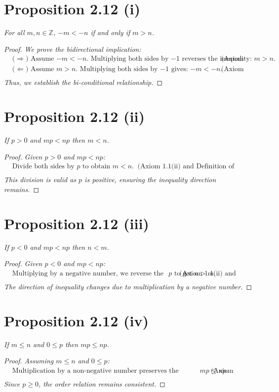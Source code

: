 \section*{Proposition 2.12 (i)}
\textit{For all $m,n \in \mathbb{Z}$, $-m < -n$ if and only if $m > n$.}
\begin{proof}
    \textit{We prove the bidirectional implication:}
    \begin{align*}
        & \text{($\Rightarrow$) Assume $-m < -n$. Multiplying both sides by $-1$ reverses the inequality: $m > n$.} & & \text{(Axiom 1.1(ii))} \\
        & \text{($\Leftarrow$) Assume $m > n$. Multiplying both sides by $-1$ gives: $-m < -n$.} & & \text{(Axiom 1.1(ii))} \\
    \end{align*}
    \textit{Thus, we establish the bi-conditional relationship.}
\end{proof}
\section*{Proposition 2.12 (ii)}
\textit{If $p > 0$ and $mp < np$ then $m < n$.}
\begin{proof}
    \textit{Given $p > 0$ and $mp < np$:}
    \begin{align*}
        & \text{Divide both sides by $p$ to obtain $m < n$.} & & \text{(Axiom 1.1(ii) and Definition of Division)} \\
    \end{align*}
    \textit{This division is valid as $p$ is positive, ensuring the inequality direction remains.}
\end{proof}
\section*{Proposition 2.12 (iii)}
\textit{If $p < 0$ and $mp < np$ then $n < m$.}
\begin{proof}
    \textit{Given $p < 0$ and $mp < np$:}
    \begin{align*}
        & \text{Multiplying by a negative number, we reverse the inequality: Divide by $p$ to get $n > m$.} & & \text{(Axiom 1.1(ii) and Definition of Division)} \\
    \end{align*}
    \textit{The direction of inequality changes due to multiplication by a negative number.}
\end{proof}
\section*{Proposition 2.12 (iv)}
\textit{If $m \leq n$ and $0 \leq p$ then $mp \leq np$.}
\begin{proof}
    \textit{Assuming $m \leq n$ and $0 \leq p$:}
    \begin{align*}
        & \text{Multiplication by a non-negative number preserves the inequality: $mp \leq np$.} & & \text{(Axiom 2.1(ii))} \\
    \end{align*}
    \textit{Since $p \geq 0$, the order relation remains consistent.}
\end{proof}


